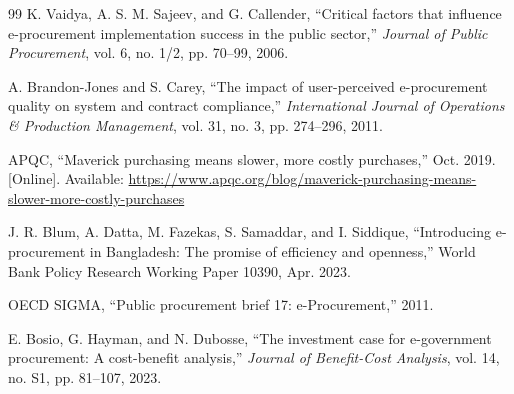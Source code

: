 \documentclass[conference]{IEEEtran}
\begin{document}
\begin{thebibliography}{99}
 K. Vaidya, A. S. M. Sajeev, and G. Callender, ``Critical factors that influence e-procurement implementation success in the public sector,'' \emph{Journal of Public Procurement}, vol. 6, no. 1/2, pp. 70--99, 2006.

 A. Brandon-Jones and S. Carey, ``The impact of user-perceived e-procurement quality on system and contract compliance,'' \emph{International Journal of Operations \& Production Management}, vol. 31, no. 3, pp. 274--296, 2011.

 APQC, ``Maverick purchasing means slower, more costly purchases,'' Oct. 2019. [Online]. Available: \url{https://www.apqc.org/blog/maverick-purchasing-means-slower-more-costly-purchases}

 J. R. Blum, A. Datta, M. Fazekas, S. Samaddar, and I. Siddique, ``Introducing e-procurement in Bangladesh: The promise of efficiency and openness,'' World Bank Policy Research Working Paper 10390, Apr. 2023.

 OECD SIGMA, ``Public procurement brief 17: e-Procurement,'' 2011.

 E. Bosio, G. Hayman, and N. Dubosse, ``The investment case for e-government procurement: A cost-benefit analysis,'' \emph{Journal of Benefit-Cost Analysis}, vol. 14, no. S1, pp. 81--107, 2023.

\end{thebibliography}
\end{document}
